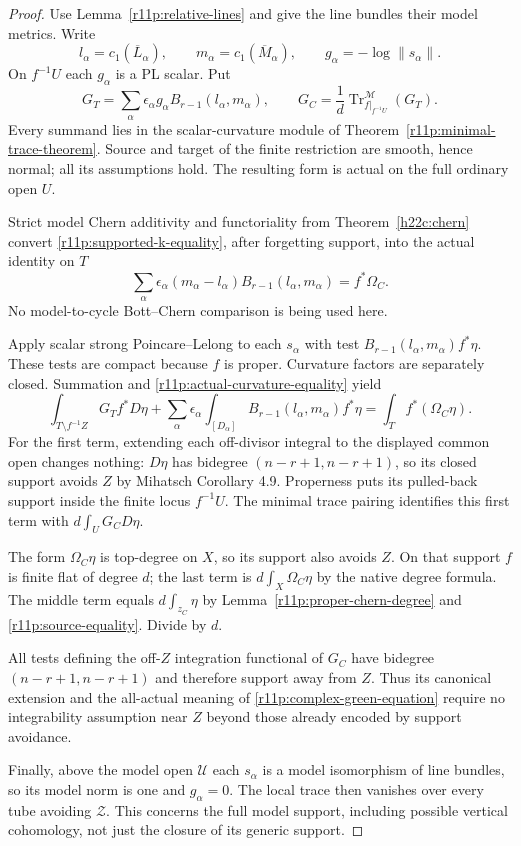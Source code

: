 \documentclass[11pt,a4paper]{article}
\theoremstyle{definition}
\theoremstyle{remark}
\begin{document}
\begin{proof}
Use Lemma~\ref{r11p:relative-lines} and give the line bundles their
model metrics.  Write
\[
 l_\alpha=c_1(\overline L_\alpha),\qquad
 m_\alpha=c_1(\overline M_\alpha),\qquad
 g_\alpha=-\log\|s_\alpha\|.
\]
On $f^{-1}U$ each $g_\alpha$ is a PL scalar.  Put
\[
       G_T=\sum_\alpha\epsilon_\alpha
                    g_\alpha B_{r-1}(l_\alpha,m_\alpha),
       \qquad
       G_C=\frac1d\operatorname{Tr}^{\mathscr M}_{f|_{f^{-1}U}}(G_T).
\tag{PC8}\label{r11p:complex-green-formula}
\]
Every summand lies in the scalar-curvature module of
Theorem~\ref{r11p:minimal-trace-theorem}.  Source and target of the
finite restriction are smooth, hence normal; all its assumptions hold.
The resulting form is actual on the full ordinary open $U$.

Strict model Chern additivity and functoriality from Theorem~\ref{h22c:chern} convert
\eqref{r11p:supported-k-equality}, after forgetting support, into
the actual identity on $T$
\[
 \sum_\alpha\epsilon_\alpha
             (m_\alpha-l_\alpha)B_{r-1}(l_\alpha,m_\alpha)
                                      =f^*\Omega_C.
\tag{PC9}\label{r11p:actual-curvature-equality}
\]
No model-to-cycle Bott--Chern comparison is being used here.

Apply scalar strong Poincare--Lelong to each $s_\alpha$ with test
$B_{r-1}(l_\alpha,m_\alpha)f^*\eta$.  These tests are compact because
$f$ is proper.  Curvature factors are separately closed.  Summation
and \eqref{r11p:actual-curvature-equality} yield
\[
 \int_{T\setminus f^{-1}Z}G_Tf^*D\eta
 +\sum_\alpha\epsilon_\alpha
       \int_{[D_\alpha]}B_{r-1}(l_\alpha,m_\alpha)f^*\eta
                         =\int_Tf^*(\Omega_C\eta).
\tag{PC10}\label{r11p:upstairs-complex-PL}
\]
For the first term, extending each off-divisor integral to the
displayed common open changes nothing: $D\eta$ has bidegree
$(n-r+1,n-r+1)$, so its closed support avoids $Z$ by
Mihatsch Corollary 4.9.  Properness puts its pulled-back support
inside the finite locus $f^{-1}U$.  The minimal trace pairing identifies
this first term with $d\int_UG_CD\eta$.

The form $\Omega_C\eta$ is top-degree on $X$, so its support also
avoids $Z$.  On that support $f$ is finite flat of degree $d$;
the last term is $d\int_X\Omega_C\eta$ by the native degree formula.
The middle term equals $d\int_{z_C}\eta$ by
Lemma~\ref{r11p:proper-chern-degree} and
\eqref{r11p:source-equality}.  Divide by $d$.

All tests defining the off-$Z$ integration functional of $G_C$
have bidegree $(n-r+1,n-r+1)$ and therefore support away from $Z$.
Thus its canonical extension and the all-actual meaning of
\eqref{r11p:complex-green-equation} require no integrability
assumption near $Z$ beyond those already encoded by support avoidance.

Finally, above the model open $\mathcal U$ each $s_\alpha$ is a model
isomorphism of line bundles, so its model norm is one and $g_\alpha=0$.
The local trace then vanishes over every tube avoiding $\mathcal Z$.
This concerns the full model support, including possible vertical
cohomology, not just the closure of its generic support.
\end{proof}
\end{document}
